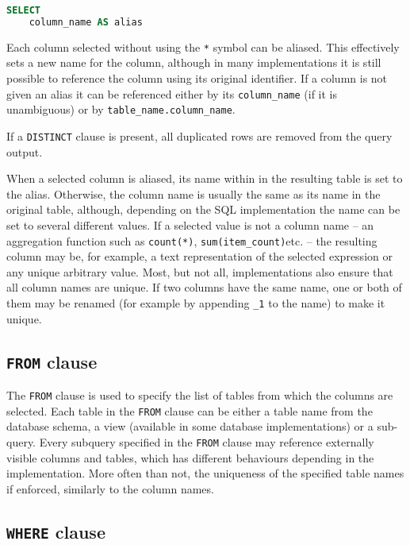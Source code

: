 \documentclass[magisterska,en]{pracamgr}
\newcommand{\code}[1]{\texttt{#1}}
\begin{document}
\begin{lstlisting}[language=SQL]
SELECT
    column_name AS alias
\end{lstlisting}


Each column selected without using the \code{*} symbol can be aliased. This effectively sets a new name for the column, although in many implementations it is still possible to reference the column using its original identifier. If a column is not given an alias it can be referenced either by its \code{column_name} (if it is unambiguous) or by \code{table_name.column_name}.

If a \code{DISTINCT} clause is present, all duplicated rows are removed from the query output.


When a selected column is aliased, its name within in the resulting table is set to the alias.  Otherwise, the column name is usually the same as its name in the original table, although, depending on the SQL implementation the name can be set to several different values. If a selected value is not a column name -- an aggregation function such as \code{count(*)}, \code{sum(item_count)}etc. -- the resulting column may be, for example, a text representation of the selected expression or any unique arbitrary value. Most, but not all, implementations also ensure that all column names are unique. If two columns have the same name, one or both of them may be renamed (for example by appending \code{_1} to the name) to make it unique.


\subsection{\code{FROM} clause}
The \code{FROM} clause is used to specify the list of tables from which the columns are selected. Each table in the \code{FROM} clause can be either a table name from the database schema, a view (available in some database implementations) or a sub-query. Every subquery specified in the \code{FROM} clause may reference externally visible columns and tables, which has different behaviours depending in the implementation. More often than not, the uniqueness of the specified table names if enforced, similarly to the column names.

\subsection{\code{WHERE} clause}
\end{document}
